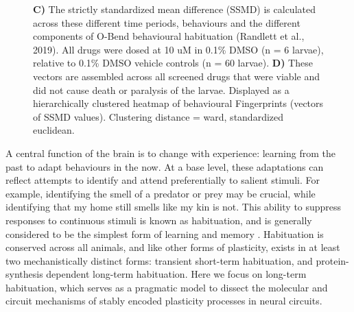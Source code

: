 \documentclass[9pt,lineno]{RandlettLab_elife}
\begin{document}
\begin{figure}
\begin{fullwidth}
\begin{center}
{\textbf{C)} The strictly standardized mean difference (SSMD) is calculated across these different time periods, behaviours and the different components of O-Bend behavioural habituation (Randlett et al., 2019). All drugs were dosed at 10 uM in 0.1\% DMSO (n = 6 larvae), relative to 0.1\% DMSO vehicle controls (n = 60 larvae). 
\textbf{D)} These vectors are assembled across all screened drugs that were viable and did not cause death or paralysis of the larvae. Displayed as a hierarchically clustered heatmap of behavioural Fingerprints (vectors of SSMD values). Clustering distance = ward, standardized euclidean. }
\label{fig:1}
\label{table:1}
\label{table:2}

\end{center}
\end{fullwidth}
\end{figure}

A central function of the brain is to change with experience: learning from the past to adapt behaviours in the now. At a base level, these adaptations can reflect attempts to identify and attend preferentially to salient stimuli. For example, identifying the smell of a predator or prey may be crucial, while identifying that my home still smells like my kin is not. This ability to suppress responses to continuous stimuli is known as habituation, and is generally considered to be the simplest form of learning and memory \cite{Rankin2009-er}. Habituation is conserved across all animals, and like other forms of plasticity, exists in at least two mechanistically distinct forms: transient short-term habituation, and protein-synthesis dependent long-term habituation. Here we focus on long-term habituation, which serves as a pragmatic model to dissect the molecular and circuit mechanisms of stably encoded plasticity processes in neural circuits. 
\end{document}
